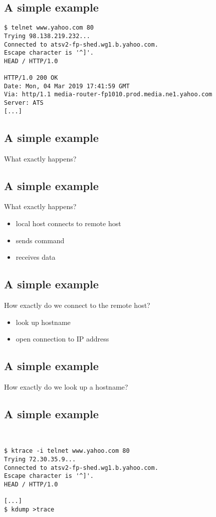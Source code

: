 \documentclass[xga]{xdvislides}
\begin{document}
\subsection{A simple example}
\Hugesize
\begin{center}
\begin{verbatim}
$ telnet www.yahoo.com 80
Trying 98.138.219.232...
Connected to atsv2-fp-shed.wg1.b.yahoo.com.
Escape character is '^]'.
HEAD / HTTP/1.0

HTTP/1.0 200 OK
Date: Mon, 04 Mar 2019 17:41:59 GMT
Via: http/1.1 media-router-fp1010.prod.media.ne1.yahoo.com
Server: ATS
[...]
\end{verbatim}
\end{center}
\Normalsize
\vspace*{\fill}

\subsection{A simple example}
What exactly happens?

\subsection{A simple example}
What exactly happens?
\\
\begin{itemize}
	\item local host connects to remote host
	\item sends command
	\item receives data
\end{itemize}

\subsection{A simple example}
How exactly do we connect to the remote host?
\\
\begin{itemize}
	\item look up hostname
	\item open connection to IP address
\end{itemize}

\subsection{A simple example}
How exactly do we look up a hostname?

\subsection{A simple example}
\\
\Hugesize
\begin{center}
\begin{verbatim}
$ ktrace -i telnet www.yahoo.com 80
Trying 72.30.35.9...
Connected to atsv2-fp-shed.wg1.b.yahoo.com.
Escape character is '^]'.
HEAD / HTTP/1.0

[...]
$ kdump >trace
\end{verbatim}
\end{center}
\Normalsize
\vspace*{\fill}
\end{document}

